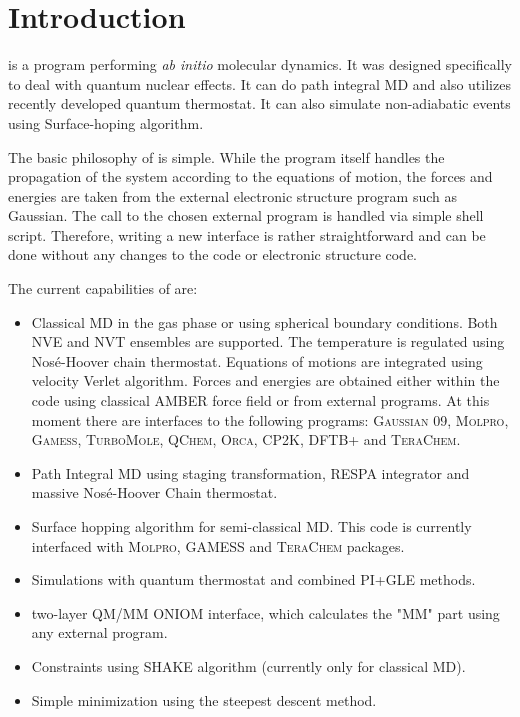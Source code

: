 \section{Introduction}
\abin is a program performing \textit{ab initio} molecular dynamics. It was designed specifically to deal with quantum nuclear effects. It can do path integral MD and also utilizes recently developed quantum thermostat\cite{Ceriotti2011}.
It can also simulate non-adiabatic events using Surface-hoping algorithm.   

The basic philosophy of \abin is simple. While the program itself handles the propagation of the system according to the equations of motion, the forces and energies are taken from the external electronic structure program such as Gaussian. The call to the chosen external program is handled via simple shell script. Therefore, writing a new interface is rather straightforward and can be done without any changes to the \abin code or electronic structure code.

The current capabilities of \abin are:
\begin{itemize}
\item Classical MD in the gas phase or using spherical boundary conditions. Both NVE and NVT ensembles are supported. The temperature is regulated using Nosé-Hoover chain thermostat\cite{Martyna1992a}. Equations of motions are integrated using velocity Verlet algorithm. Forces and energies are obtained either within the code using classical AMBER force field or from external programs. 
At this moment there are interfaces to the following programs: \textsc{Gaussian 09\cite{G09}}, \textsc{Molpro}\cite{MOLPRO06}, \textsc{Gamess}\cite{Schmidt1993}, \textsc{TurboMole}\cite{turbomole}, \textsc{QChem}\cite{Shao2006}, \textsc{Orca}\cite{Neese2012}, \textsc{CP2K}\cite{Hutter2014}, \textsc{DFTB+} and \textsc{TeraChem}\cite{Ufimtsev2008}. 

\item Path Integral MD using staging transformation, RESPA integrator and massive Nosé-Hoover Chain thermostat.

\item Surface hopping algorithm\cite{Barbatti2011} for semi-classical MD. This code is currently interfaced with \textsc{Molpro}, \textsc{GAMESS} and \textsc{TeraChem} packages. 

\item Simulations with quantum thermostat\cite{Ceriotti2010d} and combined PI+GLE\cite{Ceriotti2011} methods.

\item two-layer QM/MM ONIOM interface, which calculates the "MM" part using any external program.

\item Constraints using SHAKE algorithm (currently only for classical MD).

\item Simple minimization using the steepest descent method. 
\end{itemize} 

